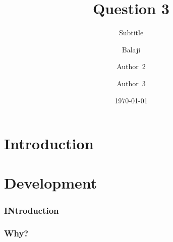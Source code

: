 \documentclass{beamer}
\begin{document}
    \begin{frame}
        \title{Question 3}
        \author{Balaji \and 
        Author~2 \and
        Author~3}
        \date{\today}
        \subtitle{Subtitle}
        \maketitle
    \end{frame}
    \section{Introduction}
    \section{Development}
    \begin{frame}
        \tableofcontents
    \end{frame}
    \begin{frame}
        \frametitle{INtroduction}
        \blindtext
    \end{frame}
    \begin{frame}
        \frametitle{Why?}
        \blindtext
    \end{frame}
\end{document}
